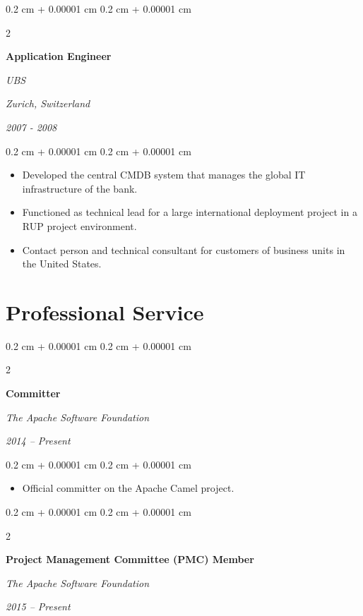 \documentclass[10pt, letterpaper]{article}
\newenvironment{highlights}{
    \begin{itemize}[
        topsep=0.10 cm,
        parsep=0.10 cm,
        partopsep=0pt,
        itemsep=0pt,
        leftmargin=0.4 cm + 10pt
    ]
}{
    \end{itemize}
} %
\newenvironment{onecolentry}{
    \begin{adjustwidth}{
        0.2 cm + 0.00001 cm
    }{
        0.2 cm + 0.00001 cm
    }
}{
    \end{adjustwidth}
} %
\newenvironment{twocolentry}[2][]{
    \onecolentry
    \def\secondColumn{#2}
    \setcolumnwidth{\fill, 8 cm}
    \begin{paracol}{2}
}{
    \switchcolumn \raggedleft \secondColumn
    \end{paracol}
    \endonecolentry
} %
\begin{document}
\vspace{0.20 cm}



%
%
\begin{twocolentry}{
        \textit{Zurich, Switzerland}

        \textit{2007 - 2008}}
    \textbf{Application Engineer}

    \textit{UBS}
\end{twocolentry}

\vspace{0.10 cm}
\begin{onecolentry}
    \begin{highlights}
        \item Developed the central CMDB system that manages the global IT infrastructure of the bank.
        \item Functioned as technical lead for a large international deployment project in a RUP project environment.
        \item Contact person and technical consultant for customers of business units in the United States.
    \end{highlights}
\end{onecolentry}

\vspace{0.20 cm}



\section{Professional Service}
\begin{twocolentry}{
        \textit{2014 – Present}}
    \textbf{Committer}

    \textit{The Apache Software Foundation}
\end{twocolentry}

\vspace{0.10 cm}
\begin{onecolentry}
    \begin{highlights}
        \item Official committer on the Apache Camel project.
    \end{highlights}
\end{onecolentry}

\vspace{0.20 cm}

\begin{twocolentry}{
        \textit{2015 – Present}}
    \textbf{Project Management Committee (PMC) Member}

    \textit{The Apache Software Foundation}
\end{twocolentry}
\end{document}
